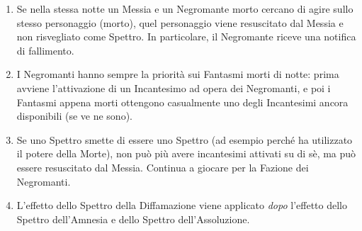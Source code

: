 \documentclass[a4paper,10pt]{article}
\begin{document}
\begin{enumerate}
	
 
	
	\item Se nella stessa notte un Messia e un Negromante morto cercano di agire sullo stesso personaggio (morto), quel personaggio viene resuscitato dal Messia e non risvegliato come Spettro. In particolare, il Negromante riceve una notifica di fallimento.
	
	\item I Negromanti hanno sempre la priorità sui Fantasmi morti di notte: prima avviene l'attivazione di un Incantesimo ad opera dei Negromanti, e poi i Fantasmi appena morti ottengono casualmente uno degli Incantesimi ancora disponibili (se ve ne sono).

	\item Se uno Spettro smette di essere uno Spettro (ad esempio perché ha utilizzato il potere della Morte), non può più avere incantesimi attivati su di sè, ma può essere resuscitato dal Messia. Continua a giocare per la Fazione dei Negromanti.
	
	\item L'effetto dello Spettro della Diffamazione viene applicato \emph{dopo} l'effetto dello Spettro dell'Amnesia e dello Spettro dell'Assoluzione.
	

\end{enumerate}
\end{document}
